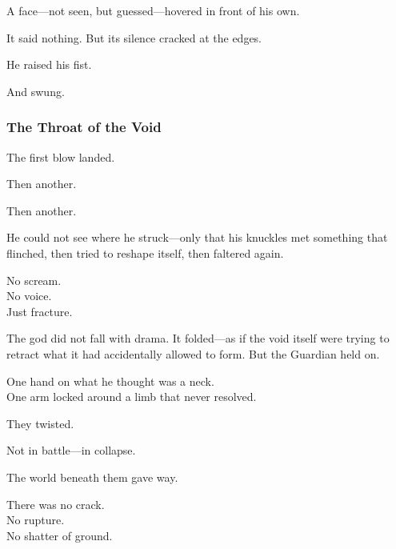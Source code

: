 \documentclass[12pt]{article}
\begin{document}
\vspace{0.5em}
A face---not seen, but guessed---hovered in front of his own.

\vspace{0.5em}
It said nothing. But its silence cracked at the edges.

\vspace{0.5em}
He raised his fist.

\vspace{0.5em}
And swung.

\dotfill

\subsubsection{The Throat of the Void}

The first blow landed.

\vspace{0.5em}
Then another.

\vspace{0.5em}
Then another.

\vspace{0.5em}
He could not see where he struck---only that his knuckles met something that flinched, then tried to reshape itself, then faltered again.

\vspace{0.5em}
No scream.\\
No voice.\\
Just fracture.

\vspace{0.5em}
The god did not fall with drama. It folded---as if the void itself were trying to retract what it had accidentally allowed to form. But the Guardian held on.

\vspace{0.5em}
One hand on what he thought was a neck.\\
One arm locked around a limb that never resolved.

\vspace{0.5em}
They twisted.

\vspace{0.5em}
Not in battle---in collapse.

\vspace{0.5em}
The world beneath them gave way.

\vspace{0.5em}
There was no crack.\\
No rupture.\\
No shatter of ground.
\end{document}
